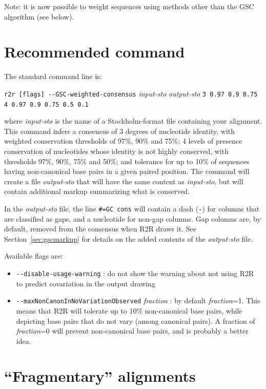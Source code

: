 \documentclass[letterpaper,12pt]{report}
\begin{document}
Note: it is now possible to weight sequences using methods other than the GSC algorithm (see below).

\section{Recommended command}
\label{sec:gscdefault}

The standard command line is:

{\tt r2r [flags] -{}-GSC-weighted-consensus} {\it input-sto} {\it output-sto} {\tt 3 0.97 0.9 0.75 4 0.97 0.9 0.75 0.5 0.1}

where {\it input-sto} is the name of a Stockholm-format file containing your alignment.
This command infers a consensus of 3 degrees of nucleotide identity, with weighted conservation thresholds
of 97\%, 90\% and 75\%; 4 levels of presence conservation of nucleotides whose identity is not highly conserved,
with thresholds 97\%, 90\%, 75\% and 50\%; and tolerance for up to 10\% of sequences having
non-canonical base pairs in a given paired position.
The command will create a file {\it output-sto} that will have the same content as {\it input-sto}, but will contain additional
markup summarizing what is conserved.

In the {\it output-sto} file, the line {\tt \#=GC cons} will contain a dash ({\tt -}) for columns that are classified as gaps, and a nucleotide for non-gap columns.
Gap columns are, by default, removed from the consensus when R2R draws it.  See Section~\ref{sec:gscmarkup} for details on the added contents of the {\it output-sto} file.

Available flags are:
\begin{itemize}
\item {\tt -{}-disable-usage-warning} : do not show the warning about not using R2R to predict covariation in the output drawing
\item {\tt -{}-maxNonCanonInNoVariationObserved} {\it fraction} : by default {\it fraction}=1. This means that R2R will tolerate up to 10\% non-canonical base pairs, while depicting base pairs that do not vary (among canonical pairs).  A fraction of {\it fraction}=0 will prevent non-canonical base pairs, and is probably a better idea.
\end{itemize}

\section{``Fragmentary'' alignments}
\end{document}
